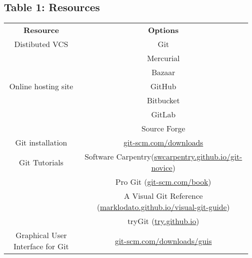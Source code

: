 \subsection{Table 1: Resources}

\begin{tabular}{ c c }
    \textbf{Resource} & \textbf{Options} \\ 
    Distibuted VCS & Git \\
                   & Mercurial \\
                   & Bazaar \\ 
    Online hosting site & GitHub \\
                        & Bitbucket \\
                        & GitLab \\
                        & Source Forge \\ 
    Git installation & \href{git-scm.com/downloads}{git-scm.com/downloads} \\ 
    Git Tutorials & Software Carpentry(\href{swcarpentry.github.io/git-novice}{swcarpentry.github.io/git-novice}) \\
                  & Pro Git (\href{git-scm.com/book}{git-scm.com/book}) \\
                  & A Visual Git Reference (\href{marklodato.github.io/visual-git-guide}{marklodato.github.io/visual-git-guide}) \\
                  & tryGit (\href{try.github.io}{try.github.io}) \\ 
    Graphical User Interface for Git & \href{git-scm.com/downloads/guis}{git-scm.com/downloads/guis} \\ 
\end{tabular}